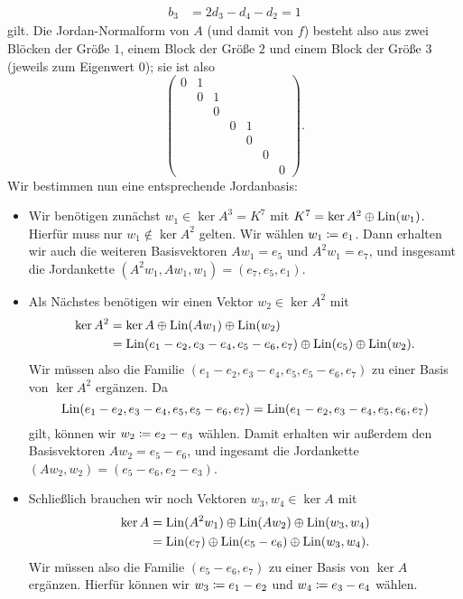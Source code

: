 \documentclass[a4paper,10pt,numbers = noenddot]{scrartcl}
\begin{document}
\begin{example}
\begin{align*}
    b_3 &= 2 d_3 - d_4 - d_2 = 1
  \end{align*}
  gilt.
  Die Jordan-Normalform von $A$ (und damit von $f$) besteht also aus zwei Blöcken der Größe $1$, einem Block der Größe $2$ und einem Block der Größe $3$ (jeweils zum Eigenwert $0$);
  sie ist also
  \[
    \begin{pmatrix}
      0 & 1 &   &   &   &   &   \\
        & 0 & 1 &   &   &   &   \\
        &   & 0 &   &   &   &   \\
        &   &   & 0 & 1 &   &   \\
        &   &   &   & 0 &   &   \\
        &   &   &   &   & 0 &   \\
        &   &   &   &   &   & 0
    \end{pmatrix}.
  \]
  Wir bestimmen nun eine entsprechende Jordanbasis:
  \begin{itemize}
    \item
      Wir benötigen zunächst $w_1 \in \ker A^3 = K^7$ mit $K^7 = \ker A^2 \oplus \operatorname{Lin}(w_1)$.
      Hierfür muss nur $w_1 \notin \ker A^2$ gelten.
      Wir wählen $w_1 \coloneqq e_1$.
      Dann erhalten wir auch die weiteren Basisvektoren $A w_1 = e_5$ und $A^2 w_1 = e_7$, und insgesamt die Jordankette $(A^2 w_1, A w_1, w_1) = (e_7, e_5, e_1)$.
    \item
      Als Nächstes benötigen wir einen Vektor $w_2 \in \ker A^2$ mit
      \begin{align*}
            \ker A^2
        &=          \ker A
            \oplus  \operatorname{Lin}(A w_1)
            \oplus  \operatorname{Lin}(w_2) \\
        &=          \operatorname{Lin}(e_1 - e_2, e_3 - e_4, e_5 - e_6, e_7)
            \oplus  \operatorname{Lin}(e_5)
            \oplus  \operatorname{Lin}(w_2).
      \end{align*}
      Wir müssen also die Familie $( e_1 - e_2, e_3 - e_4, e_5, e_5 - e_6, e_7 )$ zu einer Basis von $\ker A^2$ ergänzen.
      Da
      \[
          \operatorname{Lin}( e_1 - e_2, e_3 - e_4, e_5, e_5 - e_6, e_7 ) \\
        = \operatorname{Lin}( e_1 - e_2, e_3 - e_4, e_5, e_6, e_7 )
      \]
      gilt, können wir $w_2 \coloneqq e_2 - e_3$ wählen.
      Damit erhalten wir außerdem den Basisvektoren $A w_2 = e_5 - e_6$, und ingesamt die Jordankette $(A w_2, w_2) = (e_5 - e_6, e_2 - e_3)$.
    \item
      Schließlich brauchen wir noch Vektoren $w_3, w_4 \in \ker A$ mit
      \begin{align*}
            \ker A
        &=          \operatorname{Lin}(A^2 w_1)
            \oplus  \operatorname{Lin}(A w_2)
            \oplus  \operatorname{Lin}(w_3, w_4)  \\
        &=          \operatorname{Lin}(e_7)
            \oplus  \operatorname{Lin}(e_5 - e_6)
            \oplus  \operatorname{Lin}(w_3, w_4).
      \end{align*}
      Wir müssen also die Familie $(e_5 - e_6, e_7)$ zu einer Basis von $\ker A$ ergänzen.
      Hierfür können wir $w_3 \coloneqq e_1 - e_2$ und $w_4 \coloneqq e_3 - e_4$ wählen.
  \end{itemize}


\end{example}
\end{document}
